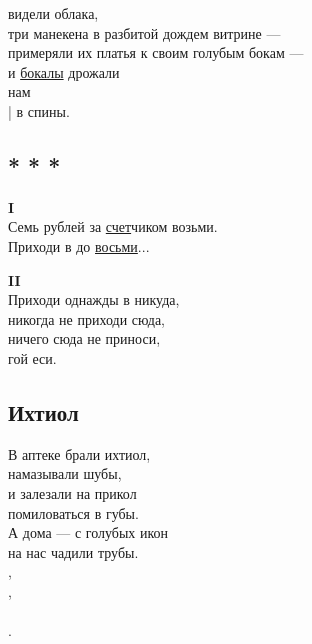 \documentclass[12pt,a5paper]{report}
\newcommand{\hl}[1]{\colorbox{black}{#1}} %
\begin{document}
видели облака, \\
три манекена в разбитой дождем витрине ---\\

примеряли их платья к своим голубым бокам ---\\
и \hyperref[bokal1]{бокалы} дрожали \\

нам \\
| в спины.\\
\newpage


\subsection[<<Семь рублей...>>]{* * *}
\label{schety}
\textbf{I}\\

Семь рублей за \hyperref[arka]{счет}чиком возьми. \\
Приходи в  до \hyperref[popugai]{восьми}...\\
\newline
\newline

\textbf{II}\\

Приходи однажды в никуда, \\
никогда не приходи сюда, \\
ничего сюда не приноси, \\
гой еси.\\

\newpage
\subsection{Ихтиол}
В аптеке брали ихтиол,\\
намазывали шубы,\\

и залезали на прикол\\
помиловаться в губы.\\

А дома --- с голубых икон\\
на нас чадили трубы.\\

\hl{\phantom{В аптеке брали ихтиол}},\\
\hl{\phantom{намазывали шубы}},\\

\hl{\phantom{и залезали на прикол}}\\
\hl{\phantom{помиловаться в губы}}.\\
\end{document}
